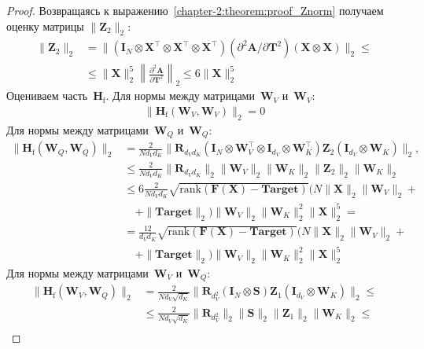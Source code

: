 \begin{proof}
Возвращаясь к выражению~\eqref{chapter-2:theorem:proof_Znorm} получаем оценку матрицы $\| \mathbf{Z}_2 \|_2$:
\begin{align}
    \| \mathbf{Z}_2 \|_2 &= \| \left(\mathbf{I}_{N} \otimes \mathbf{X}^\top \otimes \mathbf{X}^\top \otimes \mathbf{X}^\top\right) \left(\partial^2\mathbf{A}/\partial\mathbf{T}^2\right) \left(\mathbf{X} \otimes \mathbf{X}\right) \|_2 \leq \\
    &\leq \| \mathbf{X}\|^5_2 \left\| \frac{\partial^2\mathbf{A}}{\partial\mathbf{T}^2} \right\|_2 \leq 6 \| \mathbf{X}\|^5_2
\end{align}
Оцениваем часть~$\mathbf{H}_\mathrm{f}.$ Для нормы между матрицами~$\mathbf{W}_V$ и~$\mathbf{W}_V$:
\begin{align}
    \|\mathbf{H}_\mathrm{f}(\mathbf{W}_V, \mathbf{W}_V)\|_2 = 0
\end{align}
Для нормы между матрицами~$\mathbf{W}_Q$ и~$\mathbf{W}_Q$:
\begin{align}
    \|\mathbf{H}_\mathrm{f}(\mathbf{W}_Q, \mathbf{W}_Q)\|_2 &= \frac{2}{N d_V d_K} \|\mathbf{R}_{d_V d_K} \left(\mathbf{I}_{N} \otimes \mathbf{W}_V^\top \otimes \mathbf{I}_{d_V} \otimes \mathbf{W}_K^\top\right) \mathbf{Z}_2 \left(\mathbf{I}_{d_V} \otimes \mathbf{W}_K\right)\|_2, \\
    &\leq \frac{2}{N d_V d_K} \| \mathbf{R}_{d_V d_K} \|_2 \| \mathbf{W}_V \|_2 \| \mathbf{W}_K\|_2 \|\mathbf{Z}_2 \|_2 \| \mathbf{W}_K\|_2 \\
    &\leq 6\frac{2}{N d_V d_K}\sqrt{\mathrm{rank}(\mathbf{F}(\mathbf{X}) - \textbf{Target})} \Big(N \|\mathbf{X}\|_2 \|\mathbf{W}_V \|_2 +\\
    &\quad +\|\textbf{Target}\|_2\Big)\| \mathbf{W}_V \|_2 \| \mathbf{W}_K\|^2_2\| \mathbf{X}\|^5_2 =\\
    &= \frac{12}{d_V d_K}\sqrt{\mathrm{rank}(\mathbf{F}(\mathbf{X}) - \textbf{Target})} \Big(N \|\mathbf{X}\|_2 \|\mathbf{W}_V \|_2 + \\
    &\quad+\|\textbf{Target}\|_2\Big)\| \mathbf{W}_V \|_2 \| \mathbf{W}_K\|^2_2\| \mathbf{X}\|^5_2
\end{align}
Для нормы между матрицами~$\mathbf{W}_V$ и~$\mathbf{W}_Q$:
\begin{align}
    \|\mathbf{H}_\mathrm{f}(\mathbf{W}_V, \mathbf{W}_Q)\|_2 &= \frac{2}{N d_V\sqrt{d_K}} \|\mathbf{R}_{d_V^2} \left(\mathbf{I}_{N} \otimes \mathbf{S}\right) \mathbf{Z}_1 \left(\mathbf{I}_{d_V} \otimes \mathbf{W}_K\right)\|_2 \leq \\
    &\leq \frac{2}{N d_V\sqrt{d_K}} \| \mathbf{R}_{d_V^2}\|_2 \| \mathbf{S} \|_2 \|\mathbf{Z}_1 \|_2 \| \mathbf{W}_K\|_2 \leq\\

\end{align}
\end{proof}
